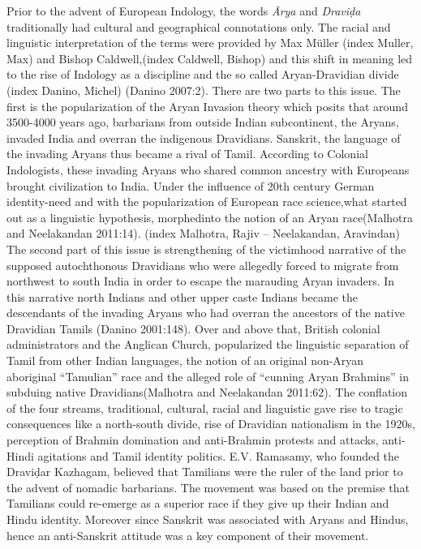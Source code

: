 Prior to the advent of European Indology, the words \textit{Ārya} and \textit{Draviḍa} traditionally had cultural and geographical connotations only. The racial and linguistic interpretation of the terms were provided by Max Müller (index Muller, Max) and Bishop Caldwell,(index Caldwell, Bishop) and this shift in meaning led to the rise of Indology as a discipline and the so called Aryan-Dravidian divide (index Danino, Michel) (Danino 2007:2). There are two parts to this issue. The first is the popularization of the Aryan Invasion theory which posits that around 3500-4000 years ago, barbarians from outside Indian subcontinent, the Aryans, invaded India and overran the indigenous Dravidians. Sanskrit, the language of the invading Aryans thus became a rival of Tamil. According to Colonial Indologists, these invading Aryans who shared common ancestry with Europeans brought civilization to India. Under the influence of 20th century German identity-need and with the popularization of European race science,what started out as a linguistic hypothesis, morphedinto the notion of an Aryan race(Malhotra and Neelakandan 2011:14). (index Malhotra, Rajiv – Neelakandan, Aravindan) The second part of this issue is strengthening of the victimhood narrative of the supposed autochthonous Dravidians who were allegedly forced to migrate from northwest to south India in order to escape the marauding Aryan invaders. In this narrative north Indians and other upper caste Indians became the descendants of the invading Aryans who had overran the ancestors of the native Dravidian Tamils (Danino 2001:148). Over and above that, British colonial administrators and the Anglican Church, popularized the linguistic separation of Tamil from other Indian languages, the notion of an original non-Aryan aboriginal “Tamulian” race and the alleged role of “cunning Aryan Brahmins” in subduing native Dravidians(Malhotra and Neelakandan 2011:62). The conflation of the four streams, traditional, cultural, racial and linguistic gave rise to tragic consequences like a north-south divide, rise of Dravidian nationalism in the 1920s, perception of Brahmin domination and anti-Brahmin protests and attacks, anti-Hindi agitations and Tamil identity politics. E.V. Ramasamy, who founded the Draviḍar Kazhagam, believed that Tamilians were the ruler of the land prior to the advent of nomadic barbarians. The movement was based on the premise that Tamilians could re-emerge as a superior race if they give up their Indian and Hindu identity. Moreover since Sanskrit was associated with Aryans and Hindus, hence an anti-Sanskrit attitude was a key component of their movement.

